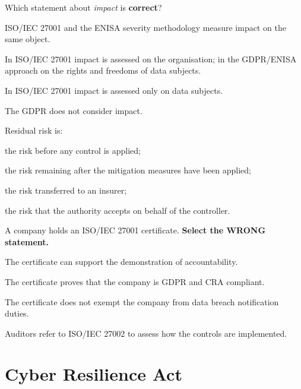 \begin{domanda}\label{q:impatto}
Which statement about \emph{impact} is \textbf{correct}?
\begin{opzioni}
  \item ISO/IEC 27001 and the ENISA severity methodology measure impact on the same object.
  \item In ISO/IEC 27001 impact is assessed on the organisation; in the GDPR/ENISA approach on the
    rights and freedoms of data subjects.
  \item In ISO/IEC 27001 impact is assessed only on data subjects.
  \item The GDPR does not consider impact.
\end{opzioni}
\end{domanda}

\begin{domanda}\label{q:residuo}
Residual risk is:
\begin{opzioni}
  \item the risk before any control is applied;
  \item the risk remaining after the mitigation measures have been applied;
  \item the risk transferred to an insurer;
  \item the risk that the authority accepts on behalf of the controller.
\end{opzioni}
\end{domanda}

\begin{domanda}\label{q:iso}
A company holds an ISO/IEC 27001 certificate. \textbf{Select the WRONG statement.}
\begin{opzioni}
  \item The certificate can support the demonstration of accountability.
  \item The certificate proves that the company is GDPR and CRA compliant.
  \item The certificate does not exempt the company from data breach notification duties.
  \item Auditors refer to ISO/IEC 27002 to assess how the controls are implemented.
\end{opzioni}
\end{domanda}

\section{Cyber Resilience Act}


